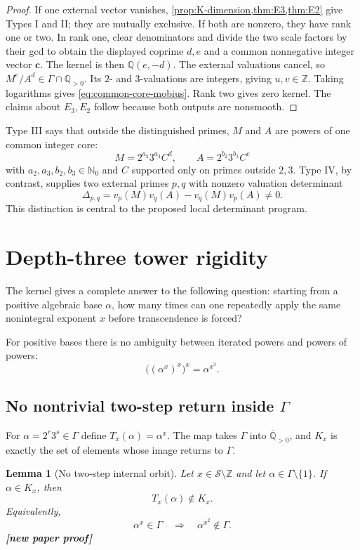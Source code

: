 \documentclass[11pt,oneside]{article}
\newtheorem{lemma}[theorem]{Lemma}
\theoremstyle{definition}
\theoremstyle{remark}
\newcommand{\Nzero}{\mathbb N_0}
\newcommand{\Z}{\mathbb Z}
\newcommand{\Q}{\mathbb Q}
\newcommand{\Apos}{\overline{\mathbb Q}_{>0}}
\newcommand{\Sol}{\mathcal S}
\newcommand{\vpp}[2]{v_{#1}\!\left(#2\right)}
\newcommand{\statusnew}{\textcolor{NewViolet}{\textbf{[new paper proof]}}}
\begin{document}
\begin{proof}
If one external vector vanishes, \cref{prop:K-dimension,thm:E3,thm:E2} give Types I and II;
they are mutually exclusive.  If both are nonzero, they have rank one or two.  In rank one,
clear denominators and divide the two scale factors by their gcd to obtain the displayed
coprime $d,e$ and a common nonnegative integer vector $\mathbf c$.  The kernel is then
$\Q(e,-d)$.  The external valuations cancel, so
$M^e/A^d\in\Gamma\cap\Q_{>0}$.  Its $2$- and $3$-valuations are integers,
giving $u,v\in\Z$.  Taking logarithms gives \eqref{eq:common-core-mobius}.  Rank two gives
zero kernel.  The claims about $E_3,E_2$ follow because both outputs are nonsmooth.
\end{proof}

Type III says that outside the distinguished primes, $M$ and $A$ are powers of one common
integer core:
\[
  M=2^{a_2}3^{a_3}C^d,
  \qquad
  A=2^{b_2}3^{b_3}C^e
\]
with $a_2,a_3,b_2,b_3\in\Nzero$ and $C$ supported only on primes outside $2,3$.  Type IV,
by contrast, supplies two external primes $p,q$ with nonzero valuation determinant
\[
 \Delta_{p,q}=
 \vpp pM\vpp qA-\vpp qM\vpp pA\ne0.                  \tag{8.6}\label{eq:external-minor}
\]
This distinction is central to the proposed local determinant program.

\section{Depth-three tower rigidity}\label{sec:tower}

The kernel gives a complete answer to the following question: starting from a positive
algebraic base $\alpha$, how many times can one repeatedly apply the same nonintegral
exponent $x$ before transcendence is forced?

For positive bases there is no ambiguity between iterated powers and powers of powers:
\[
  \bigl((\alpha^x)^x\bigr)^x
  =\alpha^{x^3}.
\]

\subsection{No nontrivial two-step return inside \texorpdfstring{$\Gamma$}{Gamma}}

For $\alpha=2^r3^s\in\Gamma$ define $T_x(\alpha)=\alpha^x$.  The map takes $\Gamma$ into
$\Apos$, and $K_x$ is exactly the set of elements whose image returns to $\Gamma$.

\begin{lemma}[No two-step internal orbit]\label{lem:no-two-step}
Let $x\in\Sol\setminus\Z$ and let $\alpha\in\Gamma\setminus\{1\}$.  If
$\alpha\in K_x$, then
\[
  T_x(\alpha)\notin K_x.
\]
Equivalently,
\[
 \alpha^x\in\Gamma
 \quad\Longrightarrow\quad
 \alpha^{x^2}\notin\Gamma.
\]
\statusnew
\end{lemma}
\end{document}
